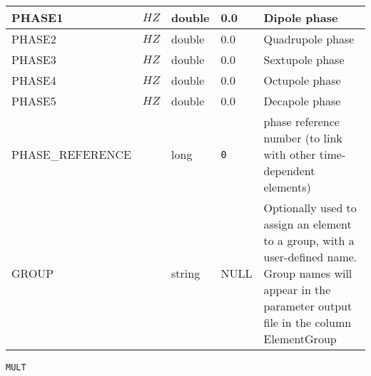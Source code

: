 \begin{tabular}{|l|l|l|l|p{\descwidth}|}
PHASE1 & $HZ$ & double &  0.0 & Dipole phase  \\ \hline 
PHASE2 & $HZ$ & double &  0.0 & Quadrupole phase  \\ \hline 
PHASE3 & $HZ$ & double &  0.0 & Sextupole phase  \\ \hline 
PHASE4 & $HZ$ & double &  0.0 & Octupole phase  \\ \hline 
PHASE5 & $HZ$ & double &  0.0 & Decapole phase  \\ \hline 
PHASE\_REFERENCE &  & long &  \verb|0| & phase reference number (to link with other time-dependent elements)  \\ \hline 
GROUP &  & string & NULL & Optionally used to assign an element to a group, with a user-defined name.  Group names will appear in the parameter output file in the column ElementGroup  \\ \hline 
\end{tabular}

\vspace*{0.5in}

\newpage
\begin{center}{\Large\verb|MULT|}\end{center}
